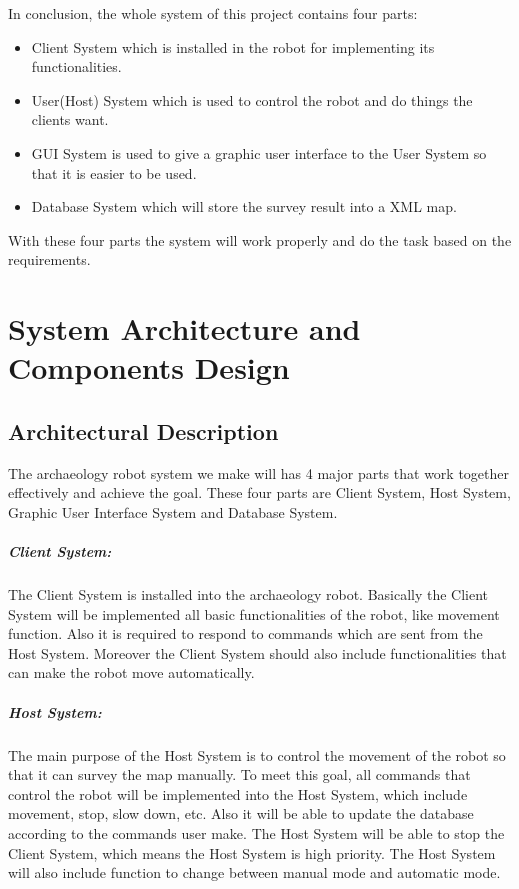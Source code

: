 \documentclass[11pt, a4paper]{report}
\begin{document}
In conclusion, the whole system of this project contains four parts:
\begin{itemize}
  \item Client System which is installed in the robot for implementing its functionalities.
  \item User(Host) System which is used to control the robot and do things the clients want.
  \item GUI System is used to give a graphic user interface to the User System so that it is easier to be used.
  \item Database System which will store the survey result into a XML map.
\end{itemize}
With these four parts the system will work properly and do the task based on the requirements.



\pagebreak


\chapter{System Architecture and Components Design}%
\label{cha:SACD}


\section{Architectural Description}
The archaeology robot system we make will has 4 major parts that work together effectively and achieve the goal. These four parts are Client System, Host System, Graphic User Interface System and Database System.
\paragraph{Client System: }The Client System is installed into the archaeology robot. Basically the Client System will be implemented all basic functionalities of the robot, like movement function. Also it is required to respond to commands which are sent from the Host System. Moreover the Client System should also include functionalities that can make the robot move automatically.
\newline
\paragraph{Host System: }The main purpose of the Host System is to control the movement of the robot so that it can survey the map manually. To meet this goal, all commands that control the robot will be implemented into the Host System, which include movement, stop, slow down, etc. Also it will be able to update the database according to the commands user make. The Host System will be able to stop the Client System, which means  the Host System is high priority. The Host System will also include function to change between manual mode and automatic mode.
\newline
\end{document}
